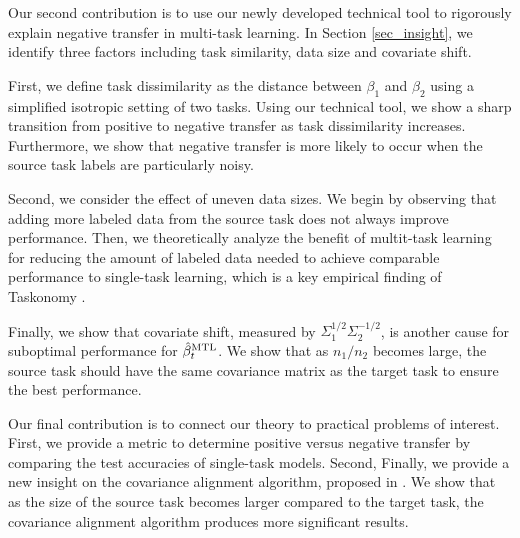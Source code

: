 Our second contribution is to use our newly developed technical tool to rigorously explain negative transfer in multi-task learning.
In Section \ref{sec_insight}, we identify three factors including task similarity, data size and covariate shift.
\squishlist
		\item First, we define task dissimilarity as the distance between $\beta_1$ and $\beta_2$ using a simplified isotropic setting of two tasks.
		Using our technical tool, we show a sharp transition from positive to negative transfer as task dissimilarity increases.
		Furthermore, we show that negative transfer is more likely to occur when the source task labels are particularly noisy.
		\item Second, we consider the effect of uneven data sizes.
	We begin by observing that adding more labeled data from the source task does not always improve performance.
	Then, we theoretically analyze the benefit of multit-task learning for reducing the amount of labeled data needed to achieve comparable performance to single-task learning, which is a key empirical finding of Taskonomy \cite{ZSSGM18}.
		\item Finally, we show that covariate shift, measured by $\Sigma_1^{1/2}\Sigma_2^{-1/2}$, is another cause for suboptimal performance for $\hat{\beta}_t^{\text{MTL}}$.
		We show that as $n_1 / n_2$ becomes large, the source task should have the same covariance matrix as the target task to ensure the best performance.
\squishend

Our final contribution is to connect our theory to practical problems of interest.
First, we provide a metric to determine positive versus negative transfer by comparing the test accuracies of single-task models.
Second, \todo{}
Finally, we provide a new insight on the covariance alignment algorithm, proposed in \cite{WZR20}.
We show that as the size of the source task becomes larger compared to the target task, the covariance alignment algorithm produces more significant results.

